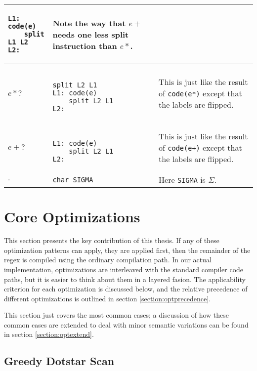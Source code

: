 \begin{table}[ht]
\begin{tabular}{| l | l | p{8cm} |}
\begin{minipage}{3cm}
\begin{verbatim}
L1: code(e)
    split L1 L2
L2: 
  \end{verbatim}
  \end{minipage}
  & Note the way that $e+$ needs one less split instruction than $e*$. \\ \hline
$e*?$ &
  \begin{minipage}{3cm}
  \begin{verbatim}

split L2 L1
L1: code(e)
    split L2 L1
L2: 
  \end{verbatim}
  \end{minipage}
  & This is just like the result of \verb'code(e*)' except that the
    labels are flipped. \\ \hline
$e+?$ &
  \begin{minipage}{3cm}
  \begin{verbatim}

L1: code(e)
    split L2 L1
L2: 
  \end{verbatim}
  \end{minipage}
  & This is just like the result of \verb'code(e+)' except that the
    labels are flipped. \\ \hline
$.$ & \verb'char SIGMA' & Here \verb'SIGMA' is $\Sigma$. \\ \hline
\end{tabular}
\end{table}

\section{Core Optimizations}
\label{section:skipscanopt}

This section presents the key contribution of this thesis. If any of
these optimization patterns can apply, they are applied first, then
the remainder of the regex is compiled using the ordinary compilation
path. In our actual implementation, optimizations are interleaved with
the standard compiler code paths, but it is easier to think about
them in a layered fasion. The applicability criterion for each
optimization is discussed below, and the relative precedence of different
optimizations is outlined in section \ref{section:optprecedence}.

This section just covers the most common cases; a discussion of
how these common cases are extended to deal with minor semantic
variations can be found in section \ref{section:optextend}.

\subsection{Greedy Dotstar Scan}

